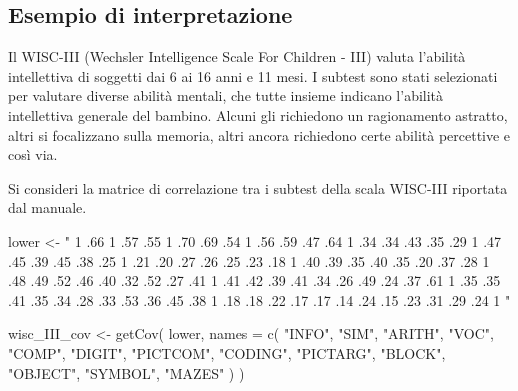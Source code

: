 \documentclass[
  11pt,
]{krantz}
\makeatletter
\newenvironment{Shaded}{\begin{snugshade}}{\end{snugshade}}
\newcommand{\AttributeTok}[1]{\textcolor[rgb]{0.61,0.61,0.61}{#1}}
\newcommand{\FunctionTok}[1]{\textcolor[rgb]{0,0,0}{#1}}
\newcommand{\NormalTok}[1]{#1}
\newcommand{\OtherTok}[1]{\textcolor[rgb]{0.37,0.37,0.37}{#1}}
\newcommand{\StringTok}[1]{\textcolor[rgb]{0.5,0.5,0.5}{#1}}
\newenvironment{kframe}{%
\medskip{}
\setlength{\fboxsep}{.8em}
 \def\at@end@of@kframe{}%
 \ifinner\ifhmode%
  \def\at@end@of@kframe{\end{minipage}}%
  \begin{minipage}{\columnwidth}%
 \fi\fi%
 \def\FrameCommand##1{\hskip\@totalleftmargin \hskip-\fboxsep
 \colorbox{shadecolor}{##1}\hskip-\fboxsep
     \hskip-\linewidth \hskip-\@totalleftmargin \hskip\columnwidth}%
 \MakeFramed {\advance\hsize-\width
   \@totalleftmargin\z@ \linewidth\hsize
   \@setminipage}}%
 {\par\unskip\endMakeFramed%
 \at@end@of@kframe}
\renewenvironment{Shaded}{\begin{kframe}}{\end{kframe}}
\makeatother
\begin{document}
\hypertarget{esempio-di-interpretazione}{%
\subsection{Esempio di interpretazione}\label{esempio-di-interpretazione}}

Il WISC-III (Wechsler Intelligence Scale For Children - III) valuta l'abilità intellettiva di soggetti dai 6 ai 16 anni e 11 mesi. I subtest sono stati selezionati per valutare diverse abilità mentali, che tutte insieme indicano l'abilità intellettiva generale del bambino. Alcuni gli richiedono un ragionamento astratto, altri si focalizzano sulla memoria, altri ancora richiedono certe abilità percettive e così via.

Si consideri la matrice di correlazione tra i subtest della scala WISC-III riportata dal manuale.

\begin{Shaded}
\begin{Highlighting}[]
\NormalTok{lower }\OtherTok{\textless{}{-}} \StringTok{"}
\StringTok{1}
\StringTok{.66      1}
\StringTok{.57 .55      1}
\StringTok{.70 .69 .54       1}
\StringTok{.56 .59 .47 .64      1}
\StringTok{.34 .34 .43 .35 .29      1}
\StringTok{.47 .45 .39 .45 .38 .25      1}
\StringTok{.21 .20 .27 .26 .25 .23 .18      1}
\StringTok{.40 .39 .35 .40 .35 .20 .37 .28      1}
\StringTok{.48 .49 .52 .46 .40 .32 .52 .27 .41      1}
\StringTok{.41 .42 .39 .41 .34 .26 .49 .24 .37 .61      1}
\StringTok{.35 .35 .41 .35 .34 .28 .33 .53 .36 .45 .38      1}
\StringTok{.18 .18 .22 .17 .17 .14 .24 .15 .23 .31 .29 .24     1}
\StringTok{"}
\end{Highlighting}
\end{Shaded}

\begin{Shaded}
\begin{Highlighting}[]
\NormalTok{wisc\_III\_cov }\OtherTok{\textless{}{-}} \FunctionTok{getCov}\NormalTok{(}
\NormalTok{  lower,}
  \AttributeTok{names =} \FunctionTok{c}\NormalTok{(}
    \StringTok{"INFO"}\NormalTok{, }\StringTok{"SIM"}\NormalTok{, }\StringTok{"ARITH"}\NormalTok{, }\StringTok{"VOC"}\NormalTok{, }\StringTok{"COMP"}\NormalTok{, }\StringTok{"DIGIT"}\NormalTok{, }\StringTok{"PICTCOM"}\NormalTok{,}
    \StringTok{"CODING"}\NormalTok{, }\StringTok{"PICTARG"}\NormalTok{, }\StringTok{"BLOCK"}\NormalTok{, }\StringTok{"OBJECT"}\NormalTok{, }\StringTok{"SYMBOL"}\NormalTok{, }\StringTok{"MAZES"}
\NormalTok{  )}
\NormalTok{)}
\end{Highlighting}
\end{Shaded}
\end{document}

